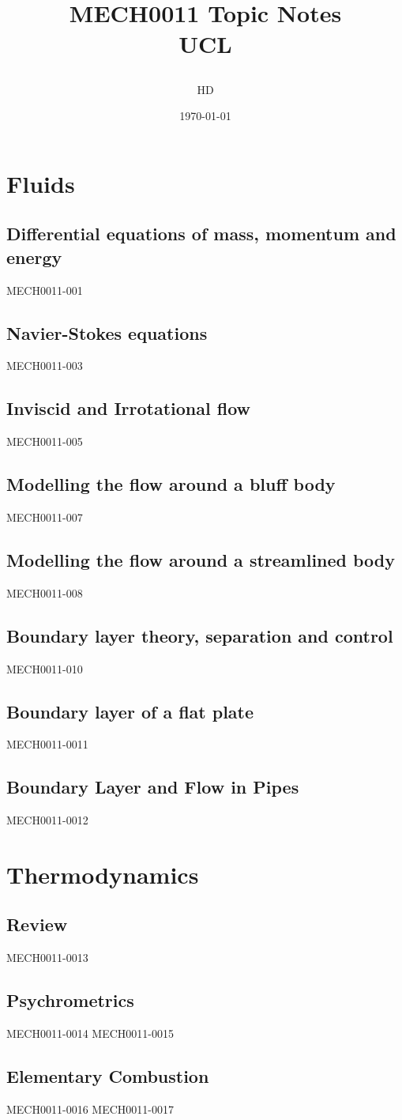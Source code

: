 \documentclass[12pt,a4paper, twoside]{report}
\begin{document}
\title{
  {MECH0011 Topic Notes}\\
  {\large UCL}
  \author{HD}
  \date{\today}
}
\maketitle
\tableofcontents
\part{Fluids}
\chapter{Differential equations of mass, momentum and energy}
{MECH0011-001}
\chapter{Navier-Stokes equations}
{MECH0011-003}
\chapter{Inviscid and Irrotational flow}
{MECH0011-005}
\chapter{Modelling the flow around a bluff body}
{MECH0011-007}
\chapter{Modelling the flow around a streamlined body}
{MECH0011-008}
\chapter{Boundary layer theory, separation and control}
{MECH0011-010}
\chapter{Boundary layer of a flat plate}
{MECH0011-0011}
\chapter{Boundary Layer and Flow in Pipes}
{MECH0011-0012}
\part{Thermodynamics}
\chapter{Review}
{MECH0011-0013}
\chapter{Psychrometrics}
{MECH0011-0014}
{MECH0011-0015}
\chapter{Elementary Combustion}
{MECH0011-0016}
{MECH0011-0017}
\end{document}
